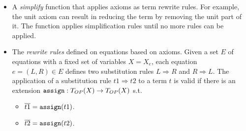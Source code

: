 \begin{itemize}
\begin{comment}
			\item $eval(N) = N_{A}$ for all constant symbols $N \in K$. 
			\item $eval(N(t1, \ldots, tn)) = N_{A}(eval(t1), \ldots, eval(tn))$ for all $N(t1, \ldots,tn) \in T_{OP}$. 
		\end{itemize}
		Given an assignment function $ass : X \rightarrow A$ with $ass(x) \in A_{s}$ for $s \in S$, the extension $\overline{ass} : T_{OP}(X) \rightarrow A$ of the assignment $ass : X \rightarrow A$ is recursively defined by 
		\begin{itemize}
			\item $\overline{ass}(x) = ass(x)$ for all variables $x \in X$
			\item $\overline{ass}(N) = N_A$ for all constant symbols $N \in K$. 
			\item $\overline{ass}(N(t1, \ldots, tn)) = N_A(\overline{ass}(t1), \ldots, \overline{ass}(t2))$ for all function symbols in $T_{OP}(X)$. 
		\end{itemize}
		\end{comment} 
		\item A \emph{simplify} function that applies axioms as term rewrite rules. For example, the 
		unit axiom can result in reducing the term by removing the unit part of it. The function applies 
		simplification rules until no more rules can be applied. 
		\begin{comment}
		\item Equational Specification \\
		A specification $SPEC = (S, OP, E)$ consists of a signature $SIG = (S, OP) $ and a set $E$ of equations $e$ w.r.t $SIG$. 
		An algebra $A$ over the specification $SPEC$ is a $SIG$- algebra $A$ which satisfies all 
		equations in $E$. 
		\end{comment}
		\item The \emph{rewrite rules} defined on equations based on axioms. 
	    Given a set $E$ of equations with a fixed set of variables $X = X_e$, each equation $e = (L,R) 
	    \in E$ defines two substitution rules $L \Rightarrow R$ and $R \Rightarrow L$. \newline
		The application of a substitution rule $t1 \Rightarrow t2$ to a term $t$ is valid if there is an 
		extension $\operatorname{\mathtt{assign}} : T_{OP}(X) \rightarrow T_{OP}(X)$ s.t. 
		\begin{itemize}
			\item $\overline{t1} = \operatorname{\mathtt{assign}}(t1)$.
			\item $\overline{t2} = \operatorname{\mathtt{assign}}(t2)$.

\end{itemize}
\end{itemize}
